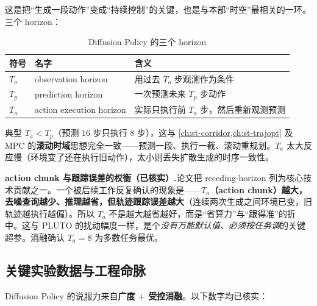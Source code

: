 这是把“生成一段动作”变成“持续控制”的关键，也是与本部“时空”最相关的一环。三个 horizon：

\begin{table}[H]\centering\small
\caption{Diffusion Policy 的三个 horizon}
\label{tab:de-horizons}
\begin{tabular}{p{} p{} p{}}
\toprule
符号 & 名字 & 含义 \\
\midrule
$T_o$ & observation horizon & 用过去 $T_o$ 步观测作为条件 \\
$T_p$ & prediction horizon & 一次预测未来 $T_p$ 步动作 \\
$T_a$ & action execution horizon & 实际只执行前 $T_a$ 步，然后重新观测预测 \\
\bottomrule
\end{tabular}
\end{table}

典型 $T_a<T_p$（预测 $16$ 步只执行 $8$ 步），这与 \cref{ch:st-corridor,ch:st-trajopt} 及 MPC 的\textbf{滚动时域}思想完全一致——预测一段、执行一截、滚动重规划。$T_a$ 太大反应慢（环境变了还在执行旧动作），太小则丢失扩散生成的时序一致性。

\begin{note}
\textbf{action chunk 与跟踪误差的权衡（已核实）.}\;论文把 receding-horizon 列为核心技术贡献之一。一个被后续工作反复确认的现象是——\textbf{$T_a$（action chunk）越大，去噪查询越少、推理越省，但轨迹跟踪误差越大}（连续两次生成之间环境已变，旧轨迹越执行越偏）。所以 $T_a$ 不是越大越省越好，而是“省算力”与“跟得准”的折中。这与 PLUTO 的扰动幅度一样，是个\emph{没有万能默认值、必须按任务调}的关键超参。消融确认 $T_a=8$ 为多数任务最优。
\end{note}

\subsection{关键实验数据与工程命脉}
\label{sec:de-dp-exp}

Diffusion Policy 的说服力来自\textbf{广度 $+$ 受控消融}。以下数字均已核实：

